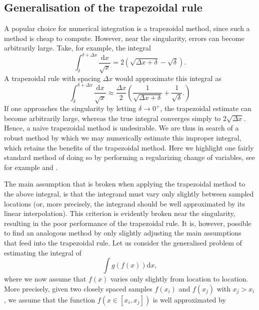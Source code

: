 \subsection{Generalisation of the trapezoidal rule} \label{eq:sec-gtrapz}
A popular choice for numerical integration is a trapezoidal method, since such a method is cheap to compute. However, near the singularity, errors can become arbitrarily large. Take, for example, the integral
\begin{equation}
    \int_\delta^{\delta+\Delta x} \frac{\mathrm{d} x}{\sqrt{x}} = 2(\sqrt{\Delta x + \delta} - \sqrt{\delta}).
    \label{eq:example-integral}
\end{equation}
A trapezoidal rule with spacing $\Delta x$ would approximate this integral as
\begin{equation}
    \int_\delta^{\delta+\Delta x} \frac{\mathrm{d} x}{\sqrt{x}} \approx \frac{\Delta x}{2} \left( \frac{1}{\sqrt{\Delta x + \delta}} + \frac{1}{\sqrt{\delta}}.  \right)
\end{equation}
If one approaches the singularity by letting $\delta \rightarrow 0^+$, the trapezoidal estimate can become arbitrarily large, whereas the true integral converges simply to $2 \sqrt{\Delta x}$. Hence, a naive trapezoidal method is undesirable. We are thus in search of a robust method by which we may numerically estimate this improper integral, which retains the benefits of the trapezoidal method. Here we highlight one fairly standard method of doing so by performing a regularizing change of variables, see for example \citet{kress1998numerical} and \citet{press2007numerical}. \par 
The main assumption that is broken when applying the trapezoidal method to the above integral, is that the integrand must vary only slightly between sampled locations (or, more precisely, the integrand should be well approximated by its linear interpolation). This criterion is evidently broken near the singularity, resulting in the poor performance of the trapezoidal rule. It is, however, possible to find an analogous method by only slightly adjusting the main assumptions that feed into the trapezoidal rule. Let us consider the generalised problem of estimating the integral of
\begin{equation}
    \int g(f(x)) \mathrm{d} x,
\end{equation}
where we now assume that $f(x)$ varies only slightly from location to location. More precisely, given two closely spaced samples $f(x_i)$ and $f(x_j)$ with $x_j>x_i$, we assume that the function $f(x \in [x_i,x_j])$ is well approximated by
